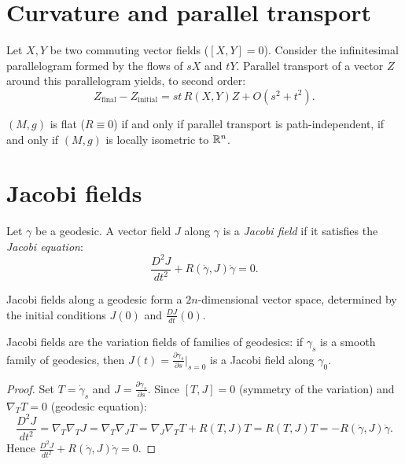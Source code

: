 \section{Curvature and parallel transport}

\begin{theorem}
Let $X, Y$ be two commuting vector fields ($[X,Y] = 0$). Consider the
infinitesimal parallelogram formed by the flows of $sX$ and $tY$. Parallel
transport of a vector $Z$ around this parallelogram yields, to second order:
\[
    Z_{\text{final}} - Z_{\text{initial}} = st\, R(X,Y)Z + O(s^2 + t^2).
\]
\end{theorem}

\begin{corollary}[Flatness]
$(M, g)$ is flat ($R \equiv 0$) if and only if parallel transport is
path-independent, if and only if $(M, g)$ is locally isometric to $\mathbb{R}^n$.
\end{corollary}

\section{Jacobi fields}

\begin{definition}
Let $\gamma$ be a geodesic. A vector field $J$ along $\gamma$ is a
\emph{Jacobi field} if it satisfies the \emph{Jacobi equation}:
\[
    \frac{D^2 J}{dt^2} + R(\dot\gamma, J)\dot\gamma = 0.
\]
\end{definition}

\begin{proposition}
Jacobi fields along a geodesic form a $2n$-dimensional vector space, determined
by the initial conditions $J(0)$ and $\frac{DJ}{dt}(0)$.
\end{proposition}

\begin{theorem}
Jacobi fields are the variation fields of families of geodesics: if $\gamma_s$
is a smooth family of geodesics, then
$J(t) = \frac{\partial\gamma_s}{\partial s}\big|_{s=0}$ is a Jacobi field
along $\gamma_0$.
\end{theorem}

\begin{proof}
Set $T = \dot\gamma_s$ and $J = \frac{\partial\gamma_s}{\partial s}$.
Since $[T, J] = 0$ (symmetry of the variation) and $\nabla_T T = 0$ (geodesic
equation):
\[
    \frac{D^2 J}{dt^2} = \nabla_T\nabla_T J = \nabla_T\nabla_J T
    = \nabla_J\nabla_T T + R(T,J)T = R(T,J)T = -R(\dot\gamma, J)\dot\gamma.
\]
Hence $\frac{D^2 J}{dt^2} + R(\dot\gamma, J)\dot\gamma = 0$.
\end{proof}

